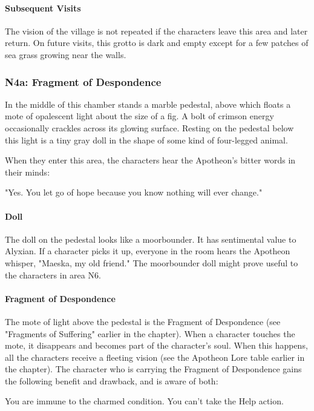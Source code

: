 \documentclass[10pt,a4,twoside,twocolumn,openany,nodeprecatedcode]{dndbook}
\begin{document}
\paragraph{Subsequent Visits}
The vision of the village is not repeated if the characters leave this area and later return. On future visits, this grotto is dark and empty except for a few patches of sea grass growing near the walls.
\subsubsection{N4a: Fragment of Despondence}
\begin{DndReadAloud}{}
In the middle of this chamber stands a marble pedestal, above which floats a mote of opalescent light about the size of a fig. A bolt of crimson energy occasionally crackles across its glowing surface. Resting on the pedestal below this light is a tiny gray doll in the shape of some kind of four-legged animal.
\end{DndReadAloud}

When they enter this area, the characters hear the Apotheon's bitter words in their minds:
\begin{DndReadAloud}{}
"Yes. You let go of hope because you know nothing will ever change."
\end{DndReadAloud}

\paragraph{Doll}
The doll on the pedestal looks like a moorbounder. It has sentimental value to Alyxian. If a character picks it up, everyone in the room hears the Apotheon whisper, "Maeska, my old friend." The moorbounder doll might prove useful to the characters in area N6.
\paragraph{Fragment of Despondence}
The mote of light above the pedestal is the Fragment of Despondence (see "Fragments of Suffering" earlier in the chapter). When a character touches the mote, it disappears and becomes part of the character's soul. When this happens, all the characters receive a fleeting vision (see the Apotheon Lore table earlier in the chapter).
The character who is carrying the Fragment of Despondence gains the following benefit and drawback, and is aware of both:
\begin{DndComment}{}
{{You are immune to the charmed condition.}}
{{You can't take the Help action.}}
\end{DndComment}
\end{document}
